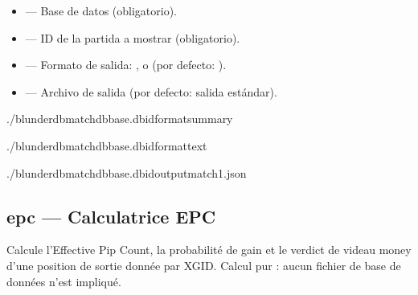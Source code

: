 \documentclass[letterpaper,10pt,spanish]{sphinxmanual}
\begin{document}
\sphinxAtStartPar
{}
\begin{itemize}
\item {} 
\sphinxAtStartPar
{} — Base de datos (obligatorio).

\item {} 
\sphinxAtStartPar
{} — ID de la partida a mostrar (obligatorio).

\item {} 
\sphinxAtStartPar
{} — Formato de salida: ,  o  (por defecto: ).

\item {} 
\sphinxAtStartPar
{} — Archivo de salida (por defecto: salida estándar).

\end{itemize}

\sphinxAtStartPar
{}

\begin{sphinxVerbatim}[commandchars=\\\{\}]
./blunderdbmatch\PYGZhy{}\PYGZhy{}dbbase.db\PYGZhy{}\PYGZhy{}id\PYGZhy{}\PYGZhy{}formatsummary

./blunderdbmatch\PYGZhy{}\PYGZhy{}dbbase.db\PYGZhy{}\PYGZhy{}id\PYGZhy{}\PYGZhy{}formattext

./blunderdbmatch\PYGZhy{}\PYGZhy{}dbbase.db\PYGZhy{}\PYGZhy{}id\PYGZhy{}\PYGZhy{}outputmatch1.json
\end{sphinxVerbatim}


\subsection{epc — Calculatrice EPC}
\label{\detokenize{cli:epc-calculatrice-epc}}
\sphinxAtStartPar
Calcule l’Effective Pip Count, la probabilité de gain et le verdict de videau
money d’une position de sortie donnée par XGID. Calcul pur : aucun fichier de
base de données n’est impliqué.
\end{document}
